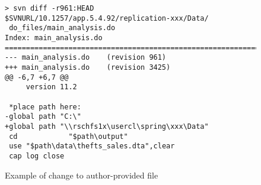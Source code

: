 

\begin{figure}
\caption{Example of change to author-provided file\label{fig:svndiff}}
\begin{verbatim}
> svn diff -r961:HEAD $SVNURL/10.1257/app.5.4.92/replication-xxx/Data/
 do_files/main_analysis.do
Index: main_analysis.do
===================================================================
--- main_analysis.do	(revision 961)
+++ main_analysis.do	(revision 3425)
@@ -6,7 +6,7 @@
     version 11.2

 *place path here:
-global path "C:\"
+global path "\\rschfs1x\usercl\spring\xxx\Data"
 cd            "$path\output"
 use "$path\data\thefts_sales.dta",clear
 cap log close

\end{verbatim}
\end{figure}


\FloatBarrier

